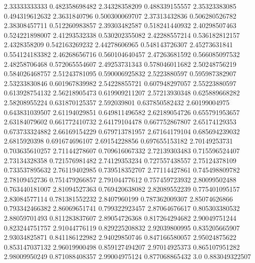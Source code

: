   2.33333333333   0.482358698482
  2.34328358209   0.488339155557
  2.35323383085   0.494319612632
   2.3631840796   0.500300069707
  2.37313432836   0.506280526782
  2.38308457711   0.512260983857
  2.39303482587   0.518241440932
  2.40298507463   0.524221898007
  2.41293532338   0.530202355082
  2.42288557214   0.536182812157
   2.4328358209   0.542163269232
  2.44278606965   0.548143726307
  2.45273631841   0.554124183382
  2.46268656716   0.560104640457
  2.47263681592   0.566085097532
  2.48258706468   0.572065554607
  2.49253731343   0.578046011682
  2.50248756219   0.584026468757
  2.51243781095   0.590006925832
   2.5223880597   0.595987382907
  2.53233830846   0.601967839982
  2.54228855721   0.607948297057
  2.55223880597   0.613928754132
  2.56218905473   0.619909211207
  2.57213930348   0.625889668282
  2.58208955224   0.631870125357
    2.592039801   0.637850582432
  2.60199004975   0.643831039507
  2.61194029851   0.649811496582
  2.62189054726   0.655791953657
  2.63184079602   0.661772410732
  2.64179104478   0.667752867807
  2.65174129353   0.673733324882
  2.66169154229   0.679713781957
  2.67164179104   0.685694239032
   2.6815920398   0.691674696107
  2.69154228856   0.697655153182
  2.70149253731   0.703635610257
  2.71144278607   0.709616067332
  2.72139303483   0.715596524407
  2.73134328358   0.721576981482
  2.74129353234   0.727557438557
  2.75124378109   0.733537895632
  2.76119402985   0.739518352707
  2.77114427861   0.745498809782
  2.78109452736   0.751479266857
  2.79104477612   0.757459723932
  2.80099502488   0.763440181007
  2.81094527363   0.769420638082
  2.82089552239   0.775401095157
  2.83084577114   0.781381552232
   2.8407960199   0.787362009307
  2.85074626866   0.793342466382
  2.86069651741   0.799322923457
  2.87064676617   0.805303380532
  2.88059701493   0.811283837607
  2.89054726368   0.817264294682
  2.90049751244   0.823244751757
  2.91044776119   0.829225208832
  2.92039800995   0.835205665907
  2.93034825871   0.841186122982
  2.94029850746   0.847166580057
  2.95024875622   0.853147037132
  2.96019900498   0.859127494207
  2.97014925373   0.865107951282
  2.98009950249   0.871088408357
  2.99004975124   0.877068865432
            3.0   0.883049322507
